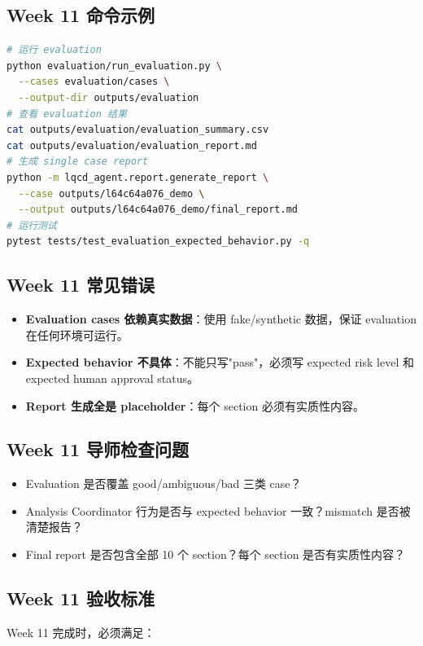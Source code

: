\documentclass[11pt,a4paper,fontset=none]{ctexart}
\begin{document}
\subsection{Week 11 命令示例}
\begin{lstlisting}[language=bash]
# 运行 evaluation
python evaluation/run_evaluation.py \
  --cases evaluation/cases \
  --output-dir outputs/evaluation
# 查看 evaluation 结果
cat outputs/evaluation/evaluation_summary.csv
cat outputs/evaluation/evaluation_report.md
# 生成 single case report
python -m lqcd_agent.report.generate_report \
  --case outputs/l64c64a076_demo \
  --output outputs/l64c64a076_demo/final_report.md
# 运行测试
pytest tests/test_evaluation_expected_behavior.py -q
\end{lstlisting}

\subsection{Week 11 常见错误}
\begin{itemize}[leftmargin=2em]
  \item \textbf{Evaluation cases 依赖真实数据}：使用 fake/synthetic 数据，保证 evaluation 在任何环境可运行。
  \item \textbf{Expected behavior 不具体}：不能只写"pass"，必须写 expected risk level 和 expected human approval status。
  \item \textbf{Report 生成全是 placeholder}：每个 section 必须有实质性内容。
\end{itemize}

\subsection{Week 11 导师检查问题}
\begin{itemize}[leftmargin=2em]
  \item Evaluation 是否覆盖 good/ambiguous/bad 三类 case？
  \item Analysis Coordinator 行为是否与 expected behavior 一致？mismatch 是否被清楚报告？
  \item Final report 是否包含全部 10 个 section？每个 section 是否有实质性内容？
\end{itemize}

\subsection{Week 11 验收标准}

Week 11 完成时，必须满足：
\end{document}
